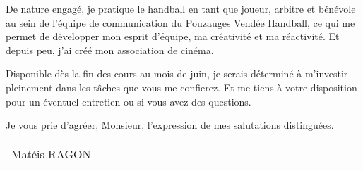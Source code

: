 \documentclass[french]{article}
\begin{document}
De nature engagé, je pratique le handball en tant que joueur, arbitre et bénévole au sein de l’équipe de communication du Pouzauges Vendée Handball, ce qui me permet de développer mon esprit d’équipe, ma créativité et ma réactivité. Et depuis peu, j'ai créé mon association de cinéma.

Disponible dès la fin des cours au mois de juin, je serais déterminé à m’investir pleinement dans les tâches que vous me confierez. Et me tiens à votre disposition pour un éventuel entretien ou si vous avez des questions.

\bigskip %

Je vous prie d’agréer, Monsieur, l’expression de mes salutations distinguées.

\vspace{50pt} %

\hfill
\begin{tabular}{@{} l}
	Matéis RAGON
\end{tabular}
\end{document}
